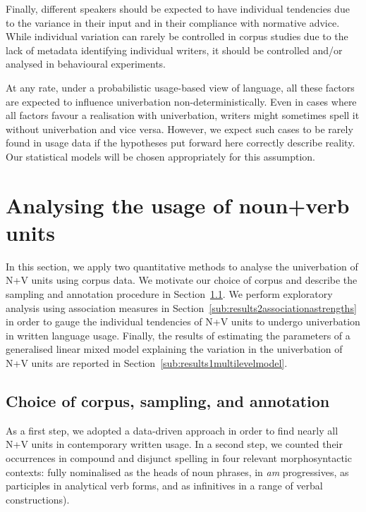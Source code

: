 \documentclass[biblatex, charis, linguex]{glossa}\usepackage{knitr}
\begin{document}
Finally, different speakers should be expected to have individual tendencies due to the variance in their input and in their compliance with normative advice.
While individual variation can rarely be controlled in corpus studies due to the lack of metadata identifying individual writers, it should be controlled and\slash or analysed in behavioural experiments.

At any rate, under a probabilistic usage-based view of language, all these factors are expected to influence univerbation non-deterministically.
Even in cases where all factors favour a realisation with univerbation, writers might sometimes spell it without univerbation and vice versa.
However, we expect such cases to be rarely found in usage data if the hypotheses put forward here correctly describe reality.
Our statistical models will be chosen appropriately for this assumption.




\section{Analysing the usage of noun+verb units}
\label{sec:corpusbasedanalysisoftheusageofnvunits}

In this section, we apply two quantitative methods to analyse the univerbation of N+V units using corpus data.
We motivate our choice of corpus and describe the sampling and annotation procedure in Section~\ref{sub:choiceofcorpussamplingandannotation}.
We perform exploratory analysis using association measures in Section~\ref{sub:results2associationastrengths} in order to gauge the individual tendencies of N+V units to undergo univerbation in written language usage.
Finally, the results of estimating the parameters of a generalised linear mixed model explaining the variation in the univerbation of N+V units are reported in Section~\ref{sub:results1multilevelmodel}.

\subsection{Choice of corpus, sampling, and annotation}
\label{sub:choiceofcorpussamplingandannotation}

As a first step, we adopted a data-driven approach in order to find nearly all N+V units in contemporary written usage.
In a second step, we counted their occurrences in compound and disjunct spelling in four relevant morphosyntactic contexts: fully nominalised as the heads of noun phrases, in \textit{am} progressives, as participles in analytical verb forms, and as infinitives in a range of verbal constructions).
\end{document}
